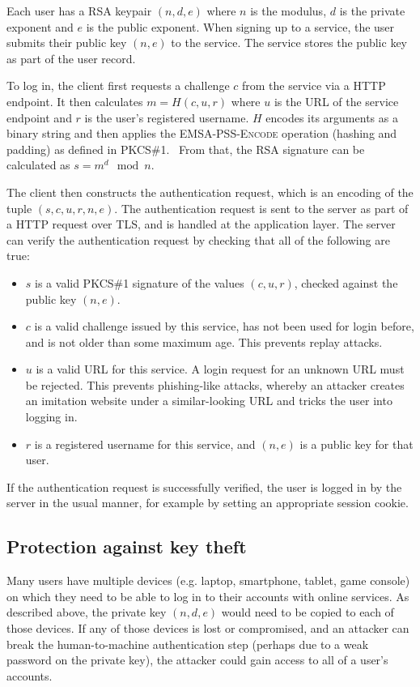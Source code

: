 Each user has a RSA keypair $(n, d, e)$ where $n$ is the modulus, $d$ is the private exponent and
$e$ is the public exponent. When signing up to a service, the user submits their public key
$(n, e)$ to the service. The service stores the public key as part of the user record.

To log in, the client first requests a challenge $c$ from the service via a HTTP endpoint. It then
calculates $m = H(c, u, r)$ where $u$ is the URL of the service endpoint and $r$ is the user's
registered username. $H$ encodes its arguments as a binary string and then applies the
\textsc{EMSA-PSS-Encode} operation (hashing and padding) as defined in PKCS\#1.~\cite{PKCS1} From
that, the RSA signature can be calculated as $s = m^d \mod n$.

The client then constructs the authentication request, which is an encoding of the tuple
$(s, c, u, r, n, e)$. The authentication request is sent to the server as part of a HTTP request
over TLS, and is handled at the application layer. The server can verify the authentication request
by checking that all of the following are true:
\begin{itemize}
\item $s$ is a valid PKCS\#1 signature of the values $(c, u, r)$, checked against the public key
$(n, e)$.
\item $c$ is a valid challenge issued by this service, has not been used for login before, and is
not older than some maximum age. This prevents replay attacks.
\item $u$ is a valid URL for this service. A login request for an unknown URL must be rejected.
This prevents phishing-like attacks, whereby an attacker creates an imitation website under a
similar-looking URL and tricks the user into logging in.
\item $r$ is a registered username for this service, and $(n, e)$ is a public key for that user.
\end{itemize}
If the authentication request is successfully verified, the user is logged in by the server in the
usual manner, for example by setting an appropriate session cookie.

\subsection{Protection against key theft}\label{sec:revocation}

Many users have multiple devices (e.g. laptop, smartphone, tablet, game console) on which they need
to be able to log in to their accounts with online services. As described above, the private key
$(n, d, e)$ would need to be copied to each of those devices. If any of those devices is lost or
compromised, and an attacker can break the human-to-machine authentication step (perhaps due to a
weak password on the private key), the attacker could gain access to all of a user's accounts.

